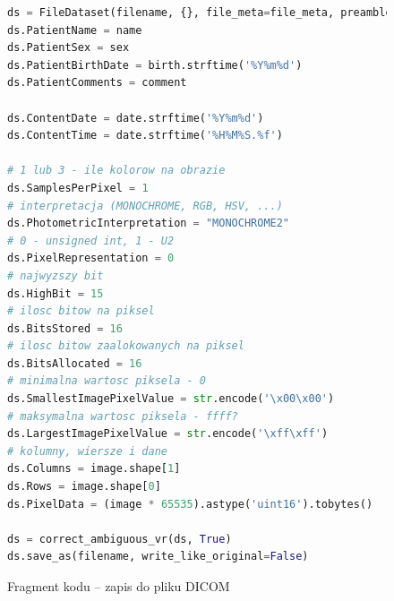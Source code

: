 \documentclass[polish,polish,a4paper]{article}
\begin{document}
			\begin{figure}[!h]
				\centering
				\begin{lstlisting}[language=Python, frame=single]
ds = FileDataset(filename, {}, file_meta=file_meta, preamble=b"\0" * 128)
ds.PatientName = name
ds.PatientSex = sex
ds.PatientBirthDate = birth.strftime('%Y%m%d')
ds.PatientComments = comment

ds.ContentDate = date.strftime('%Y%m%d')
ds.ContentTime = date.strftime('%H%M%S.%f')

# 1 lub 3 - ile kolorow na obrazie
ds.SamplesPerPixel = 1
# interpretacja (MONOCHROME, RGB, HSV, ...)
ds.PhotometricInterpretation = "MONOCHROME2"
# 0 - unsigned int, 1 - U2
ds.PixelRepresentation = 0
# najwyzszy bit
ds.HighBit = 15
# ilosc bitow na piksel
ds.BitsStored = 16
# ilosc bitow zaalokowanych na piksel
ds.BitsAllocated = 16
# minimalna wartosc piksela - 0
ds.SmallestImagePixelValue = str.encode('\x00\x00')
# maksymalna wartosc piksela - ffff?
ds.LargestImagePixelValue = str.encode('\xff\xff')
# kolumny, wiersze i dane
ds.Columns = image.shape[1]
ds.Rows = image.shape[0]
ds.PixelData = (image * 65535).astype('uint16').tobytes()

ds = correct_ambiguous_vr(ds, True)
ds.save_as(filename, write_like_original=False)
				\end{lstlisting}
				\caption{Fragment kodu -- zapis do pliku DICOM}
				\label{dicomsave}
			\end{figure}
			
\end{document}
